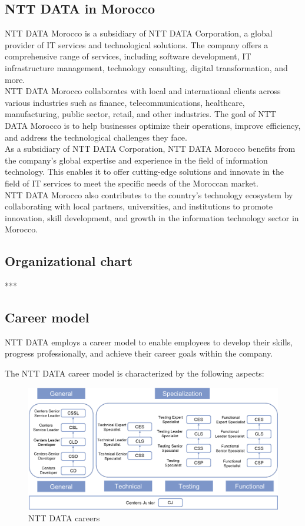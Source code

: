\pagebreak


\subsection{NTT DATA in Morocco}

NTT DATA Morocco is a subsidiary of NTT DATA Corporation, a global provider of IT services and technological solutions. The company offers a comprehensive range of services, including software development, IT infrastructure management, technology consulting, digital transformation, and more.\\

NTT DATA Morocco collaborates with local and international clients across various industries such as finance, telecommunications, healthcare, manufacturing, public sector, retail, and other industries. The goal of NTT DATA Morocco is to help businesses optimize their operations, improve efficiency, and address the technological challenges they face.\\

As a subsidiary of NTT DATA Corporation, NTT DATA Morocco benefits from the company's global expertise and experience in the field of information technology. This enables it to offer cutting-edge solutions and innovate in the field of IT services to meet the specific needs of the Moroccan market.\\

NTT DATA Morocco also contributes to the country's technology ecosystem by collaborating with local partners, universities, and institutions to promote innovation, skill development, and growth in the information technology sector in Morocco.


\subsection{Organizational chart}

***

\subsection{Career model}


NTT DATA employs a career model to enable employees to develop their skills, progress professionally, and achieve their career goals within the company.

The NTT DATA career model is characterized by the following aspects:

\begin{figure}[h!]
	\centering
	\includegraphics[width=0.65\linewidth]{Image/nttcareer.png}
	\caption{NTT DATA careers}
	\label{fig:NTT DATA careers}
\end{figure}


